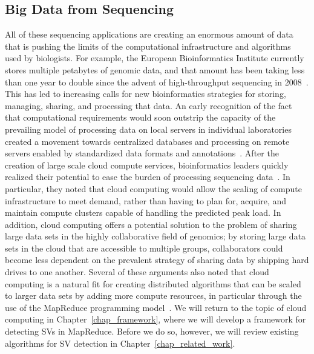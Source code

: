 \subsection{Big Data from Sequencing}\label{section_seq_big_data}

All of these sequencing applications are creating an enormous amount of data that is pushing the limits of the computational infrastructure and algorithms used by biologists. For example, the European Bioinformatics Institute currently stores multiple petabytes of genomic data, and that amount has been taking less than one year to double since the advent of high-throughput sequencing in 2008~\cite{Marx:2013dz}. This has led to increasing calls for new bioinformatics strategies for storing, managing, sharing, and processing that data. An early recognition of the fact that computational requirements would soon outstrip the capacity of the prevailing model of processing data on local servers in individual laboratories created a movement towards centralized databases and processing on remote servers enabled by standardized data formats and annotations~\cite{Stein:2008gh}. After the creation of large scale cloud compute services, bioinformatics leaders quickly realized their potential to ease the burden of processing sequencing data~\cite{Stein:2010gp,Schatz:2010js,Schadt:2010dp}. In particular, they noted that cloud computing would allow the scaling of compute infrastructure to meet demand, rather than having to plan for, acquire, and maintain compute clusters capable of handling the predicted peak load. In addition, cloud computing offers a potential solution to the problem of sharing large data sets in the highly collaborative field of genomics; by storing large data sets in the cloud that are accessible to multiple groups, collaborators could become less dependent on the prevalent strategy of sharing data by shipping hard drives to one another. Several of these arguments also noted that cloud computing is a natural fit for creating distributed algorithms that can be scaled to larger data sets by adding more compute resources, in particular through the use of the MapReduce programming model~\cite{Schatz:2010js,Schadt:2010dp}. We will return to the topic of cloud computing in Chapter~\ref{chap_framework}, where we will develop a framework for detecting SVs in MapReduce. Before we do so, however, we will review existing algorithms for SV detection in Chapter~\ref{chap_related_work}.
